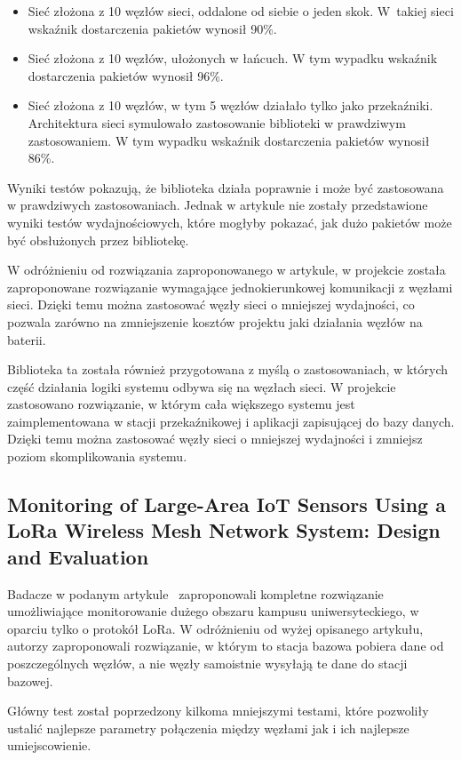 \begin{itemize}
    \item Sieć złożona z 10 węzłów sieci, oddalone od siebie o jeden skok. W~takiej sieci wskaźnik dostarczenia pakietów wynosił 90\%.
    \item Sieć złożona z 10 węzłów, ułożonych w łańcuch. W tym wypadku wskaźnik dostarczenia pakietów wynosił 96\%.
    \item Sieć złożona z 10 węzłów, w tym 5 węzłów działało tylko jako przekaźniki. Architektura sieci symulowało zastosowanie biblioteki w prawdziwym zastosowaniem. W tym wypadku wskaźnik dostarczenia pakietów wynosił 86\%.
\end{itemize}

Wyniki testów pokazują, że biblioteka działa poprawnie i może być zastosowana w prawdziwych zastosowaniach. Jednak w artykule nie zostały przedstawione wyniki testów wydajnościowych, które mogłyby pokazać, jak dużo pakietów może być obsłużonych przez bibliotekę.

W odróżnieniu od rozwiązania zaproponowanego w artykule, w projekcie została zaproponowane rozwiązanie wymagające jednokierunkowej komunikacji z węzłami sieci. Dzięki temu można zastosować węzły sieci o mniejszej wydajności, co pozwala zarówno na zmniejszenie kosztów projektu jaki działania węzłów na baterii.

Biblioteka ta została również przygotowana z myślą o zastosowaniach, w których część działania logiki systemu odbywa się na węzłach sieci. W projekcie zastosowano rozwiązanie, w którym cała większego systemu jest zaimplementowana w stacji przekaźnikowej i aplikacji zapisującej do bazy danych. Dzięki temu można zastosować węzły sieci o mniejszej wydajności i zmniejsz poziom skomplikowania systemu.

\subsection{Monitoring of Large-Area IoT Sensors Using a LoRa Wireless Mesh Network System: Design and Evaluation}

Badacze w podanym artykule~\cite{bib:loramesh-lee} zaproponowali kompletne rozwiązanie umożliwiające monitorowanie dużego obszaru kampusu uniwersyteckiego, w oparciu tylko o protokół LoRa. W odróżnieniu od wyżej opisanego artykułu, autorzy zaproponowali rozwiązanie, w którym to stacja bazowa pobiera dane od poszczególnych węzłów, a nie węzły samoistnie wysyłają te dane do stacji bazowej.

Główny test został poprzedzony kilkoma mniejszymi testami, które pozwoliły ustalić najlepsze parametry połączenia między węzłami jak i ich najlepsze umiejscowienie.


